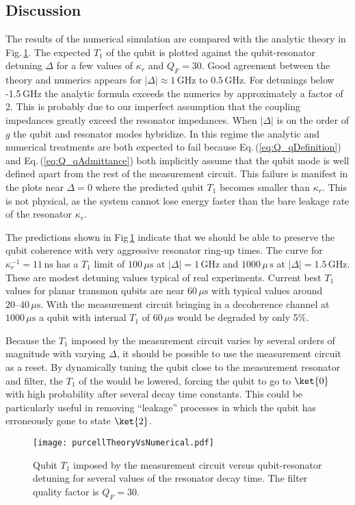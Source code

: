 \subsection{Discussion}

The results of the numerical simulation are compared with the analytic theory in Fig.\,\ref{Fig:purcellTheoryVsNumerical}.
The expected $T_1$ of the qubit is plotted against the qubit-resonator detuning $\Delta$ for a few values of $\kappa_r$ and $Q_F=30$.
Good agreement between the theory and numerics appears for $\left| \Delta \right| \approx 1\,\text{GHz} \text{ to } 0.5\,\text{GHz}$.
For detunings below -1.5\,GHz the analytic formula exceeds the numerics by approximately a factor of 2.
This is probably due to our imperfect assumption that the coupling impedances greatly exceed the resonator impedances.
When $\left| \Delta \right|$ is on the order of $g$ the qubit and resonator modes hybridize.
In this regime the analytic and numerical treatments are both expected to fail because Eq.\,(\ref{eq:Q_qDefinition}) and Eq.\,(\ref{eq:Q_qAdmittance}) both implicitly assume that the qubit mode is well defined apart from the rest of the measurement circuit.
This failure is manifest in the plots near $\Delta=0$ where the predicted qubit $T_1$ becomes smaller than $\kappa_r$.
This is not physical, as the system cannot lose energy faster than the bare leakage rate of the resonator $\kappa_r$.

The predictions shown in Fig\,\ref{Fig:purcellTheoryVsNumerical} indicate that we should be able to preserve the qubit coherence with very aggressive resonator ring-up times.
The curve for $\kappa_r^{-1} = 11\,\text{ns}$ has a $T_1$ limit of $100\,\mu\text{s}$ at $\left| \Delta \right| = 1\,\text{GHz}$ and $1000\,\mu\,\text{s}$ at $\left| \Delta \right| = 1.5\,\text{GHz}$.
These are modest detuning values typical of real experiments. Current best $T_1$ values for planar transmon qubits are near $60\,\mu\text{s}$ with typical values around $20\text{--}40\,\mu\text{s}$.
With the measurement circuit bringing in a decoherence channel at $1000\,\mu\text{s}$ a qubit with internal $T_1$ of $60\,\mu\text{s}$ would be degraded by only 5\%.

Because the $T_1$ imposed by the measurement circuit varies by several orders of magnitude with varying $\Delta$, it should be possible to use the measurement circuit as a reset.
By dynamically tuning the qubit close to the measurement resonator and filter, the $T_1$ of the would be lowered, forcing the qubit to go to $\ket{0}$ with high probability after several decay time constants.
This could be particularly useful in removing ``leakage'' processes in which the qubit has erroneously gone to state $\ket{2}$.

\begin{figure}
\begin{centering}
\texttt{[image: purcellTheoryVsNumerical.pdf]}
\par\end{centering}
\caption{Qubit $T_1$ imposed by the measurement circuit versus qubit-resonator detuning for several values of the resonator decay time. The filter quality factor is $Q_F=30$.}
\label{Fig:purcellTheoryVsNumerical}
\end{figure}

